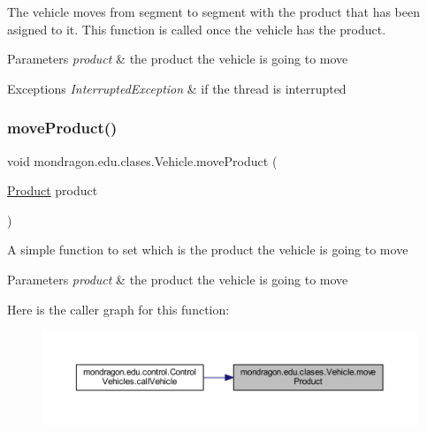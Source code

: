 The vehicle moves from segment to segment with the product that has been asigned to it. This function is called once the vehicle has the product.


\begin{DoxyParams}{Parameters}
{\em product} & the product the vehicle is going to move \\
\hline
\end{DoxyParams}

\begin{DoxyExceptions}{Exceptions}
{\em Interrupted\+Exception} & if the thread is interrupted \\
\hline
\end{DoxyExceptions}
\mbox{\label{classmondragon_1_1edu_1_1clases_1_1_vehicle_a9848250e8a7bbf1dadf63262cae2ddac}} 
\subsubsection{\texorpdfstring{moveProduct()}{moveProduct()}}
{\footnotesize\ttfamily void mondragon.\+edu.\+clases.\+Vehicle.\+move\+Product (\begin{DoxyParamCaption}\item[{\mbox{\hyperlink{classmondragon_1_1edu_1_1clases_1_1_product}{Product}}}]{product }\end{DoxyParamCaption})\hspace{0.3cm}{\ttfamily [inline]}}

A simple function to set which is the product the vehicle is going to move


\begin{DoxyParams}{Parameters}
{\em product} & the product the vehicle is going to move \\
\hline
\end{DoxyParams}
Here is the caller graph for this function\+:\nopagebreak
\begin{figure}[H]
\begin{center}
\leavevmode
\includegraphics[width=350pt]{classmondragon_1_1edu_1_1clases_1_1_vehicle_a9848250e8a7bbf1dadf63262cae2ddac_icgraph}
\end{center}
\end{figure}
\mbox{\label{classmondragon_1_1edu_1_1clases_1_1_vehicle_aa8c62e43372fe2ea461933e68f69ab2b}} 
